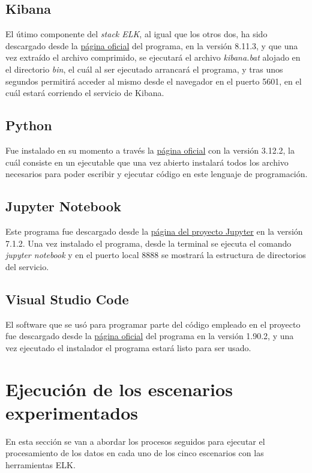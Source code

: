 \subsection{Kibana}
El útimo componente del \textit{stack ELK}, al igual que los otros dos, ha sido descargado desde la \href{https://www.elastic.co/es/kibana}{página oficial} del programa, en la versión 8.11.3, y que una vez extraído el archivo comprimido, se ejecutará el archivo \textit{kibana.bat} alojado en el directorio \textit{bin}, el cuál al ser ejecutado arrancará el programa, y tras unos segundos permitirá acceder al mismo desde el navegador en el puerto 5601, en el cuál estará corriendo el servicio de Kibana. 

\subsection{Python}
Fue instalado en su momento a través la \href{https://www.python.org/}{página oficial} con la versión 3.12.2, la cuál consiste en un ejecutable que una vez abierto instalará todos los archivo necesarios para poder escribir y ejecutar código en este lenguaje de programación.

\subsection{Jupyter Notebook}
Este programa fue descargado desde la \href{https://jupyter.org/}{página del proyecto Jupyter} en la versión 7.1.2. Una vez instalado el programa, desde la terminal se ejecuta el comando \textit{jupyter notebook} y en el puerto local 8888 se mostrará la estructura de directorios del servicio.

\subsection{Visual Studio Code}
El software que se usó para programar parte del código empleado en el proyecto fue descargado desde la \href{https://code.visualstudio.com/}{página oficial} del programa en la versión 1.90.2, y una vez ejecutado el instalador el programa estará listo para ser usado.

\section{Ejecución de los escenarios experimentados}
En esta sección se van a abordar los procesos seguidos para ejecutar el procesamiento de los datos en cada uno de los cinco escenarios con las herramientas ELK.

